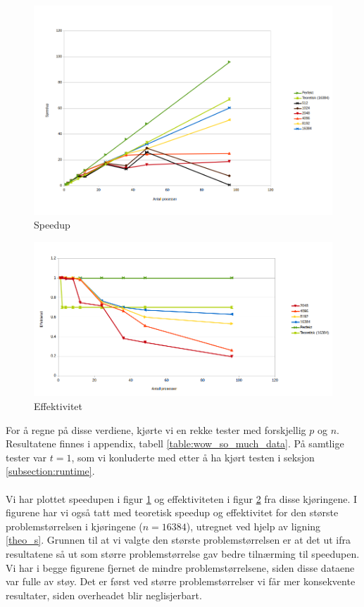 \documentclass{article}
\begin{document}
\begin{figure}[t]
	\centering
	\includegraphics[width=12cm]{img/speedup.png}
	\caption{Speedup}
	\label{fig:speedup}
		
\end{figure}

\begin{figure}[t]
	\centering
	\includegraphics[width=12cm]{img/efficiency.png}
	\caption{Effektivitet}		
	\label{fig:eff}
\end{figure}

For å regne på disse verdiene, kjørte vi en rekke tester med forskjellig $p$ og $n$. Resultatene finnes i appendix, tabell \ref{table:wow_so_much_data}. På samtlige tester var $t=1$, som vi konluderte med etter å ha kjørt testen i seksjon \ref{subsection:runtime}.\\
\\
Vi har plottet speedupen i figur \ref{fig:speedup} og effektiviteten i figur \ref{fig:eff} fra disse kjøringene. I figurene har vi også tatt med teoretisk speedup og effektivitet for den største problemstørrelsen i kjøringene ($n = 16384$), utregnet ved hjelp av ligning \ref{theo_s}. Grunnen til at vi valgte den største problemstørrelsen er at det ut ifra resultatene så ut som større problemstørrelse gav bedre tilnærming til speedupen. Vi har i begge figurene fjernet de mindre problemstørrelsene, siden disse dataene var fulle av støy. Det er først ved større problemstørrelser vi får mer konsekvente resultater, siden overheadet blir neglisjerbart.\\
\end{document}
